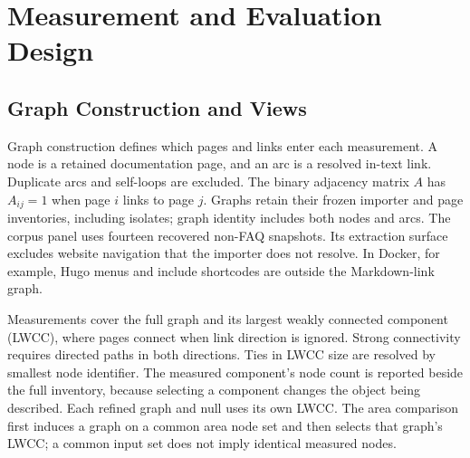\section{Measurement and Evaluation Design}
\label{sec:design}
\subsection{Graph Construction and Views}
Graph construction defines which pages and links enter each measurement.
A node is a retained documentation page, and an arc is a resolved in-text link.
Duplicate arcs and self-loops are excluded. The binary adjacency matrix $A$ has
$A_{ij}=1$ when page $i$ links to page $j$. Graphs retain their frozen importer
and page inventories, including isolates; graph identity includes both nodes and
arcs. The corpus panel uses fourteen recovered non-FAQ snapshots.
Its extraction surface excludes website
navigation that the importer does not resolve. In Docker, for example, Hugo menus
and include shortcodes are outside the Markdown-link graph.

Measurements cover the full graph and its largest weakly connected component
(LWCC), where pages connect when link direction is ignored. Strong connectivity requires
directed paths in both directions. Ties in LWCC size are resolved by smallest node
identifier. The measured component's node count is reported beside the full
inventory, because selecting a component changes the object being described.
Each refined graph and null uses its own LWCC. The area comparison first induces
a graph on a common area node set and then selects that graph's LWCC; a common
input set does not imply identical measured nodes.

